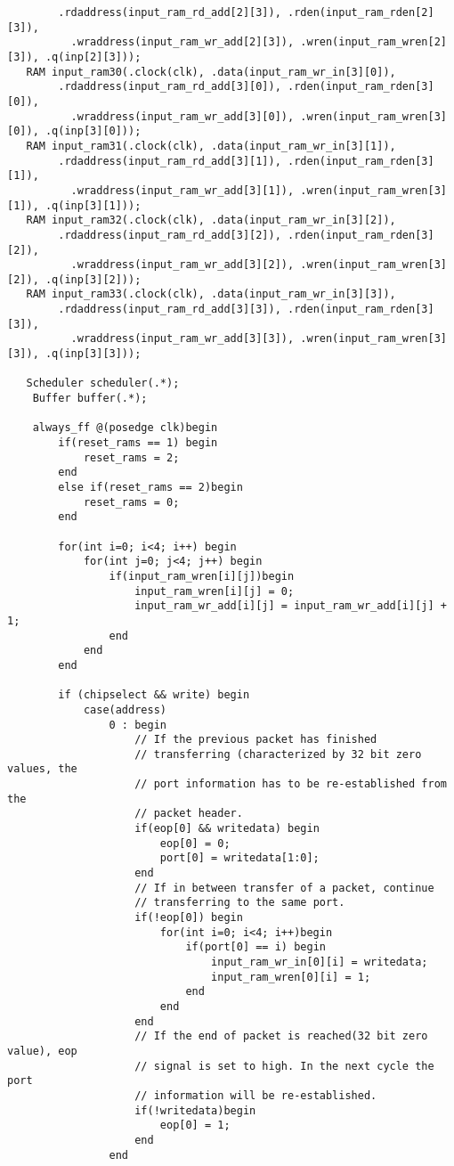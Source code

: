 \documentclass[twoside,12pt,fleqn]{book} %
\begin{document}
\begin{lstlisting}
        .rdaddress(input_ram_rd_add[2][3]), .rden(input_ram_rden[2][3]),
          .wraddress(input_ram_wr_add[2][3]), .wren(input_ram_wren[2][3]), .q(inp[2][3]));
   RAM input_ram30(.clock(clk), .data(input_ram_wr_in[3][0]),
        .rdaddress(input_ram_rd_add[3][0]), .rden(input_ram_rden[3][0]),
          .wraddress(input_ram_wr_add[3][0]), .wren(input_ram_wren[3][0]), .q(inp[3][0]));
   RAM input_ram31(.clock(clk), .data(input_ram_wr_in[3][1]),
        .rdaddress(input_ram_rd_add[3][1]), .rden(input_ram_rden[3][1]),
          .wraddress(input_ram_wr_add[3][1]), .wren(input_ram_wren[3][1]), .q(inp[3][1]));
   RAM input_ram32(.clock(clk), .data(input_ram_wr_in[3][2]),
        .rdaddress(input_ram_rd_add[3][2]), .rden(input_ram_rden[3][2]),
          .wraddress(input_ram_wr_add[3][2]), .wren(input_ram_wren[3][2]), .q(inp[3][2]));
   RAM input_ram33(.clock(clk), .data(input_ram_wr_in[3][3]),
        .rdaddress(input_ram_rd_add[3][3]), .rden(input_ram_rden[3][3]),
          .wraddress(input_ram_wr_add[3][3]), .wren(input_ram_wren[3][3]), .q(inp[3][3]));

   Scheduler scheduler(.*);
	Buffer buffer(.*);

	always_ff @(posedge clk)begin
		if(reset_rams == 1) begin
			reset_rams = 2;
		end
		else if(reset_rams == 2)begin
			reset_rams = 0;
		end

        for(int i=0; i<4; i++) begin
            for(int j=0; j<4; j++) begin
                if(input_ram_wren[i][j])begin
                    input_ram_wren[i][j] = 0;
                    input_ram_wr_add[i][j] = input_ram_wr_add[i][j] + 1;
                end
            end
        end

		if (chipselect && write) begin
			case(address)
				0 : begin
				    // If the previous packet has finished
				    // transferring (characterized by 32 bit zero values, the
				    // port information has to be re-established from the
				    // packet header.
                    if(eop[0] && writedata) begin
                        eop[0] = 0;
                        port[0] = writedata[1:0];
                    end
                    // If in between transfer of a packet, continue
                    // transferring to the same port.
                    if(!eop[0]) begin
                        for(int i=0; i<4; i++)begin
                            if(port[0] == i) begin
                                input_ram_wr_in[0][i] = writedata;
                                input_ram_wren[0][i] = 1;
                            end
                        end
                    end
                    // If the end of packet is reached(32 bit zero value), eop
                    // signal is set to high. In the next cycle the port
                    // information will be re-established.
                    if(!writedata)begin
                        eop[0] = 1;
                    end
				end


\end{lstlisting}
\end{document}
